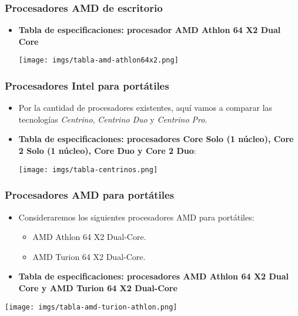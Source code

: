 \frame
{
\frametitle{Procesadores AMD de escritorio}
\begin{itemize}
 \item \textbf{Tabla de especificaciones: procesador \textbf{AMD Athlon 64 X2 Dual Core}}
\begin{center}
\texttt{[image: imgs/tabla-amd-athlon64x2.png]}
\end{center}
\end{itemize}
}

\frame
{
\frametitle{Procesadores Intel para portátiles}
\begin{itemize}
 \item Por la cantidad de procesadores existentes, aquí vamos a comparar las tecnologías \textit{Centrino}, \textit{Centrino Duo} y \textit{Centrino Pro}.
 \item \textbf{Tabla de especificaciones: procesadores \textbf{Core Solo (1 núcleo), Core 2 Solo (1 núcleo), Core Duo y Core 2 Duo}}:
\begin{center}
\texttt{[image: imgs/tabla-centrinos.png]}
\end{center}
\end{itemize}
}

\frame
{
\frametitle{Procesadores AMD para portátiles}
\begin{itemize}
\item Consideraremos los siguientes procesadores AMD para portátiles:
	\begin{itemize}
	\item AMD Athlon 64 X2 Dual-Core.
	\item AMD Turion 64 X2 Dual-Core.
	\end{itemize}

 \item \textbf{Tabla de especificaciones: procesadores AMD Athlon 64 X2 Dual Core y AMD Turion 64 X2 Dual-Core}
\end{itemize}

\begin{center}
\texttt{[image: imgs/tabla-amd-turion-athlon.png]}
\end{center}
}
